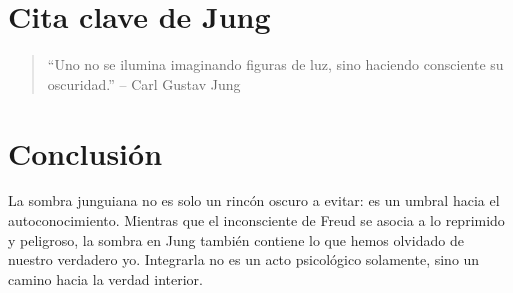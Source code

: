 \documentclass[12pt]{article}
\begin{document}
\section*{Cita clave de Jung}

\begin{quote}
“Uno no se ilumina imaginando figuras de luz, sino haciendo consciente su oscuridad.”  
\hfill – Carl Gustav Jung
\end{quote}

\section*{Conclusión}

La sombra junguiana no es solo un rincón oscuro a evitar: es un umbral hacia el autoconocimiento. Mientras que el inconsciente de Freud se asocia a lo reprimido y peligroso, la sombra en Jung también contiene lo que hemos olvidado de nuestro verdadero yo. Integrarla no es un acto psicológico solamente, sino un camino hacia la verdad interior.
\end{document}
